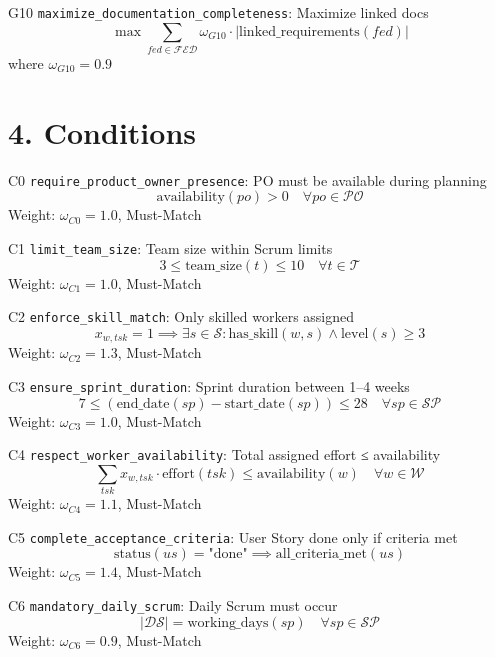 \documentclass[12pt]{article}
\begin{document}
    \item[G10] \texttt{maximize\_documentation\_completeness}: Maximize linked docs
    \[
    \max \sum_{fed \in \mathcal{FED}} \omega_{G10} \cdot |\text{linked\_requirements}(fed)|
    \]
    where $ \omega_{G10} = 0.9 $

\section{4. Conditions}
\item[C0] \texttt{require\_product\_owner\_presence}: PO must be available during planning
    \[
    \text{availability}(po) > 0 \quad \forall po \in \mathcal{PO}
    \]
    Weight: $ \omega_{C0} = 1.0 $, Must-Match

    \item[C1] \texttt{limit\_team\_size}: Team size within Scrum limits
    \[
    3 \leq \text{team\_size}(t) \leq 10 \quad \forall t \in \mathcal{T}
    \]
    Weight: $ \omega_{C1} = 1.0 $, Must-Match

    \item[C2] \texttt{enforce\_skill\_match}: Only skilled workers assigned
    \[
    x_{w,tsk} = 1 \implies \exists s \in \mathcal{S}: \text{has\_skill}(w,s) \land \text{level}(s) \geq 3
    \]
    Weight: $ \omega_{C2} = 1.3 $, Must-Match

    \item[C3] \texttt{ensure\_sprint\_duration}: Sprint duration between 1–4 weeks
    \[
    7 \leq (\text{end\_date}(sp) - \text{start\_date}(sp)) \leq 28 \quad \forall sp \in \mathcal{SP}
    \]
    Weight: $ \omega_{C3} = 1.0 $, Must-Match

    \item[C4] \texttt{respect\_worker\_availability}: Total assigned effort ≤ availability
    \[
    \sum_{tsk} x_{w,tsk} \cdot \text{effort}(tsk) \leq \text{availability}(w) \quad \forall w \in \mathcal{W}
    \]
    Weight: $ \omega_{C4} = 1.1 $, Must-Match

    \item[C5] \texttt{complete\_acceptance\_criteria}: User Story done only if criteria met
    \[
    \text{status}(us) = \text{"done"} \implies \text{all\_criteria\_met}(us)
    \]
    Weight: $ \omega_{C5} = 1.4 $, Must-Match

    \item[C6] \texttt{mandatory\_daily\_scrum}: Daily Scrum must occur
    \[
    |\mathcal{DS}| = \text{working\_days}(sp) \quad \forall sp \in \mathcal{SP}
    \]
    Weight: $ \omega_{C6} = 0.9 $, Must-Match
\end{document}
